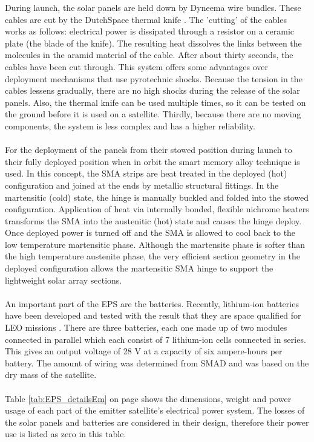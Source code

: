 During launch, the solar panels are held down by Dyneema wire bundles. These cables are cut by the DutchSpace thermal knife \cite{dutchspace}. The 'cutting' of the cables works as follows: electrical power is dissipated through a resistor on a ceramic plate (the blade of the knife). The resulting heat dissolves the links between the molecules in the aramid material of the cable. After about thirty seconds, the cables have been cut through. This system offers some advantages over deployment mechanisms that use pyrotechnic shocks. Because the tension in the cables lessens gradually, there are no high shocks during the release of the solar panels. Also, the thermal knife can be used multiple times, so it can be tested on the ground before it is used on a satellite. Thirdly, because there are no moving components, the system is less complex and has a higher reliability.
\\\\
For the deployment of the panels from their stowed position during launch to their fully deployed position when in orbit the smart memory alloy technique is used. In this concept, the SMA strips are heat treated in the deployed (hot) configuration and joined at the ends by metallic structural fittings. In the martensitic (cold) state, the hinge is manually buckled and folded into the stowed configuration. Application of heat via internally bonded, flexible nichrome heaters transforms the SMA into the austenitic (hot) state and causes the hinge deploy. Once deployed power is turned off and the SMA is allowed to cool back to the low temperature martensitic phase. Although the martensite phase is softer than the high temperature austenite phase, the very efficient section geometry in the deployed configuration allows the martensitic SMA hinge to support the lightweight solar array sections.
\\ \\
An important part of the EPS are the batteries. Recently, lithium-ion batteries have been developed and tested with the result that they are space qualified for LEO missions \cite{LEO_li_ion}. There are three batteries, each one made up of two modules connected in parallel which each consist of 7 lithium-ion cells connected in series. This gives an output voltage of 28 V at a capacity of six ampere-hours per battery.
The amount of wiring was determined from SMAD \cite{larson} and was based on the dry mass of the satellite.
\\ \\
Table \ref{tab:EPS_detailsEm} on page \pageref{tab:EPS_detailsEm} shows the dimensions, weight and power usage of each part of the emitter satellite's electrical power system. The losses of the solar panels and batteries are considered in their design, therefore their power use is listed as zero in this table.


